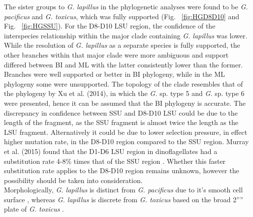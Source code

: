 \documentclass[12pt]{article}
\begin{document}
The sister groups to \emph{G. lapillus} in the phylogenetic analyses were found to be \emph{G. pacificus} and \emph{G. toxicus}, 
which was fully supported (Fig. ~\ref{fig:HGD8D10} and Fig. ~\ref{fig:HGSSU}). 
For the D8-D10 LSU region, the confidence of the interspecies relationship within the major clade containing \emph{G. lapillus} was lower.  
While the resolution of \emph{G. lapillus} as a separate species is fully supported, the other branches within that major clade were more ambiguous and support differed between BI and ML with the latter consistently lower than the former. 
Branches were well supported or better in BI phylogeny, while in the ML phylogeny some were unsupported. 
The topology of the clade resembles that of the phylogeny by Xu et al. (2014), in which the \emph{G.} sp. type 5 and \emph{G.} sp. type 6 were presented, hence it can be assumed that the BI phylogeny is accurate\citep{xu2014distribution}.
The discrepancy in confidence between SSU and D8-D10 LSU could be due to the length of the fragment, as the SSU fragment is almost twice the length as the LSU fragment. 
Alternatively it could be due to lower selection pressure, in effect higher mutation rate, in the D8-D10 region compared to the SSU region. 
Murray et al. (2015) found that the D1-D6 LSU region in dinoflagellates had a substitution rate 4-8\% times that of the SSU region \citep{murray2005improving}. 
Whether this faster substitution rate applies to the D8-D10 region remains unknown, however the possibility should be taken into consideration. \\
Morphologically, \emph{G. lapillus} is distinct from \emph{G. pacificus} due to it's smooth cell surface \citep{chinain1999morphology}, whereas \emph{G. lapillus} is discrete from \emph{G. toxicus} based on the broad 2'''' plate of \emph{G. toxicus} \citep{litaker2009taxonomy}.\\
\end{document}

